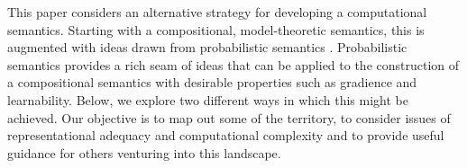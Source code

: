 \documentclass[manuscript]{clv2}
\newcommand{\hide}[1]{}
\begin{document}
This paper considers an alternative  strategy for developing a computational semantics. Starting with a compositional, model-theoretic semantics, this is augmented with ideas drawn from probabilistic semantics \cite{Gaifman:64,Nilsson:86,Sato:95}. Probabilistic semantics provides a rich seam of ideas that can be applied to the construction of a compositional semantics with desirable properties such as gradience and learnability. Below, we explore two different ways in which this might be achieved. Our objective is to map out some of the territory,  to consider issues of representational adequacy and computational complexity and to provide useful guidance for others venturing into this landscape. 


\hide{We show how to compute with both approaches, and show that both are
able to perform learning and inference on small examples. For example,
they can learn that while ``some cats $X$'' entails ``some animals
$X$'', entailment is reversed with other quantifiers: ``no animals
$X$'' entails ``no cats $X$''.}
\end{document}
